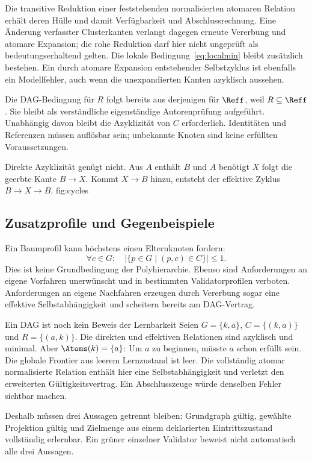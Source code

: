 Die transitive Reduktion einer feststehenden normalisierten atomaren
Relation erhält deren Hülle und damit Verfügbarkeit und Abschlussrechnung.
Eine Änderung verfasster Clusterkanten verlangt dagegen erneute Vererbung
und atomare Expansion; die rohe Reduktion darf hier nicht ungeprüft als
bedeutungserhaltend gelten. Die lokale Bedingung~\eqref{eq:localmin}
bleibt zusätzlich bestehen.
Ein durch atomare Expansion entstehender Selbstzyklus ist ebenfalls ein
Modellfehler, auch wenn die unexpandierten Kanten azyklisch aussehen.

Die DAG-Bedingung für $R$ folgt bereits aus derjenigen für $\Reff$, weil
$R\subseteq\Reff$. Sie bleibt als verständliche eigenständige
Autorenprüfung aufgeführt. Unabhängig davon bleibt die Azyklizität von $C$
erforderlich. Identitäten und Referenzen müssen auflösbar sein; unbekannte
Knoten sind keine erfüllten Voraussetzungen.

{Direkte Azyklizität genügt nicht. Aus $A$ enthält $B$ und $A$ benötigt $X$
folgt die geerbte Kante $B\to X$. Kommt $X\to B$ hinzu, entsteht der
effektive Zyklus $B\to X\to B$.}
{fig:cycles}
\FloatBarrier

\subsection{Zusatzprofile und Gegenbeispiele}
Ein Baumprofil kann höchstens einen Elternknoten fordern:
\[
 \forall c\in G:\quad
 \bigl|\{p\in G\mid(p,c)\in C\}\bigr|\leq1.
\]
Dies ist keine Grundbedingung der Polyhierarchie. Ebenso sind Anforderungen
an eigene Vorfahren unerwünscht und in bestimmten Validatorprofilen
verboten. Anforderungen an eigene Nachfahren erzeugen durch Vererbung sogar
eine effektive Selbstabhängigkeit und scheitern bereits am DAG-Vertrag.

\begin{principle}{Ein DAG ist noch kein Beweis der Lernbarkeit}
Seien $G=\{k,a\}$, $C=\{(k,a)\}$ und $R=\{(a,k)\}$.
Die direkten und effektiven Relationen sind azyklisch und minimal.
Aber $\Atoms(k)=\{a\}$: Um $a$ zu beginnen, müsste $a$ schon erfüllt sein.
Die globale Frontier aus leerem Lernzustand ist leer.
Die vollständig atomar normalisierte Relation enthält hier eine
Selbstabhängigkeit und verletzt den erweiterten Gültigkeitsvertrag. Ein
Abschlusszeuge würde denselben Fehler sichtbar machen.
\end{principle}

Deshalb müssen drei Aussagen getrennt bleiben: Grundgraph gültig,
gewählte Projektion gültig und Zielmenge aus einem deklarierten Eintrittszustand
vollständig erlernbar. Ein grüner einzelner Validator beweist nicht
automatisch alle drei Aussagen.

